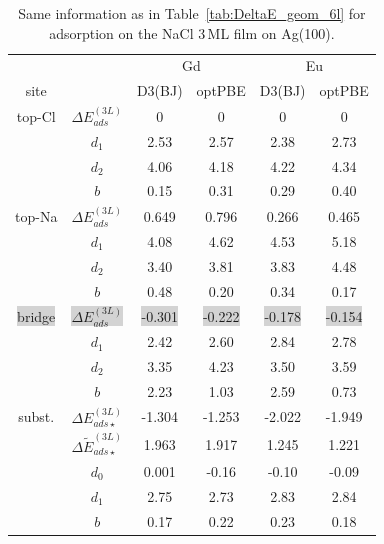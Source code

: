 {\begin{table}[b]
\caption{Same information as in Table~\ref{tab:DeltaE_geom_6l} for adsorption on the NaCl 3\,ML
film on Ag(100). }
\renewcommand{\arraystretch}{1.7}
\begin{ruledtabular}
 \begin{tabular}{c c     c  c | c c}
         &          & \multicolumn{2}{c|}{Gd}      & \multicolumn{2}{c}{Eu}  \\
 site    &          &  D3(BJ)  &   optPBE          & D3(BJ)  &   optPBE      \\
\hline
top-Cl   &  $\Delta E^{(3L)}_{ads}$   &  0   &  0    &  0     &  0       \\
         &  $d_1$   &  2.53       &  2.57     &  2.38    &  2.73         \\
         &  $d_2$   &  4.06       &  4.18     &  4.22    &  4.34         \\
         &  $b$     &  0.15       &  0.31     &  0.29    &  0.40         \\
\hline
top-Na   &  $\Delta E^{(3L)}_{ads}$   &  0.649   &  0.796  &   0.266     &  0.465  \\
         &  $d_1$   &  4.08       &  4.62       &  4.53    &   5.18      \\
         &  $d_2$   &  3.40       &  3.81       &  3.83    &   4.48      \\
         &  $b$     &  0.48       &  0.20       &  0.34    &   0.17      \\
\hline
\colorbox{lightgray}{{ bridge}}   &  \colorbox{lightgray}{${ \Delta E^{(3L)}_{ads} }$}  & \colorbox{lightgray}{{ -0.301}}   & \colorbox{lightgray}{{ -0.222}}   &  \colorbox{lightgray}{{ -0.178}}    & \colorbox{lightgray}{{ -0.154}}   \\
         &  $d_1$   &  2.42      &   2.60     &  2.84    &   2.78        \\
         &  $d_2$   &  3.35      &   4.23     &  3.50    &   3.59        \\
         &  $b$     &  2.23      &   1.03     &  2.59    &   0.73        \\
\hline
subst.   &  $\Delta E_{ads\star}^{(3L)}$  & -1.304   &  -1.253   & -2.022    &  -1.949  \\
         &  $\Delta \tilde E_{ads\star}^{(3L)}$            &  1.963   &   1.917   & 1.245     &   1.221   \\

         &  $d_0$   & 0.001      &   -0.16    & -0.10    &  -0.09        \\
         &  $d_1$   &  2.75      &    2.73    &  2.83    &   2.84        \\
         &  $b$     &  0.17      &    0.22    &  0.23    &   0.18        \\
\end{tabular}
\end{ruledtabular}
\label{tab:DeltaE_geom_ag3l}
\end{table}



}
